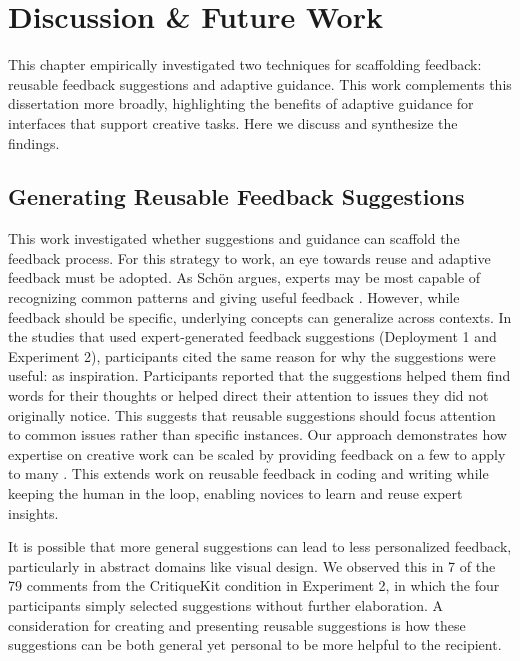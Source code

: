 \section{Discussion \& Future Work}
This chapter empirically investigated two techniques for scaffolding feedback: reusable feedback suggestions and adaptive guidance. This work complements this dissertation more broadly, highlighting the benefits of adaptive guidance for interfaces that support creative tasks. Here we discuss and synthesize the findings.  

\subsection{Generating Reusable Feedback Suggestions}
This work investigated whether suggestions and guidance can scaffold the feedback process. For this strategy to work, an eye towards reuse and adaptive feedback must be adopted. As Sch\"{o}n argues, experts may be most capable of recognizing common patterns and giving useful feedback \cite{schon1984reflective}. However, while feedback should be specific, underlying concepts can generalize across contexts. In the studies that used expert-generated feedback suggestions (Deployment 1 and Experiment 2), participants cited the same reason for why the suggestions were useful: as inspiration. Participants reported that the suggestions helped them find words for their thoughts or helped direct their attention to issues they did not originally notice. This suggests that reusable suggestions should focus attention to common issues rather than specific instances. Our approach demonstrates how expertise on creative work can be scaled by providing feedback on a few to apply to many \cite{kulkarni2013peer}. This extends work on reusable feedback in coding and writing \cite{Brooks2014, Hartmann2010, Head2017} while keeping the human in the loop, enabling novices to learn and reuse expert insights. 

It is possible that more general suggestions can lead to less personalized feedback, particularly in abstract domains like visual design. We observed this in 7 of the 79 comments from the CritiqueKit condition in Experiment 2, in which the four participants simply selected suggestions without further elaboration. A consideration for creating and presenting reusable suggestions is how these suggestions can be both general yet personal to be more helpful to the recipient. 

